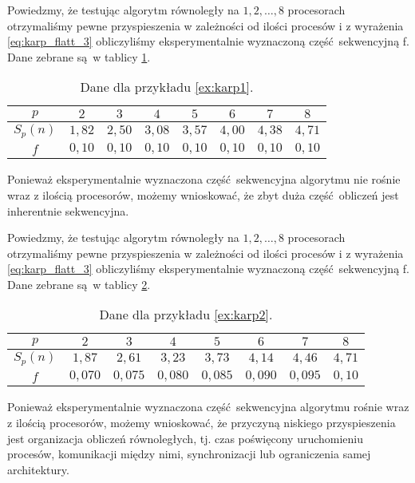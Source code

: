 \begin{przyklad}\label{ex:karp1}
Powiedzmy, że testując algorytm równoległy na \(1, 2, \dots, 8\) procesorach otrzymaliśmy pewne przyspieszenia w zależności od ilości procesów i z wyrażenia \ref{eq:karp_flatt_3} obliczyliśmy eksperymentalnie wyznaczoną część sekwencyjną f. Dane zebrane są w tablicy \ref{tab:karp_flat1}.

\begin{table}[H]
\centering
\begin{tabular}{|c|c|c|c|c|c|c|c|}
\hline
\(p\) & \(2\) & \(3\) & \(4\) & \(5\) & \(6\) & \(7\) & \(8\) \\
\hline
\(S_p(n)\) & \(1,82\) & \(2,50\) & \(3,08\) & \(3,57\) & \(4,00\) & \(4,38\) & \(4,71\) \\
\hline
\(f\) & \(0,10\) & \(0,10\) & \(0,10\) & \(0,10\) & \(0,10\) & \(0,10\) & \(0,10\) \\
\hline
\end{tabular}
\caption{Dane dla przykładu \ref{ex:karp1}.}
\label{tab:karp_flat1}
\end{table}

Ponieważ eksperymentalnie wyznaczona część sekwencyjna algorytmu nie rośnie wraz z ilością procesorów, możemy wnioskować, że zbyt duża część obliczeń jest inherentnie sekwencyjna.
\end{przyklad}

\begin{przyklad}\label{ex:karp2}
Powiedzmy, że testując algorytm równoległy na \(1, 2, \dots, 8\) procesorach otrzymaliśmy pewne przyspieszenia w zależności od ilości procesów i z wyrażenia \ref{eq:karp_flatt_3} obliczyliśmy eksperymentalnie wyznaczoną część sekwencyjną f. Dane zebrane są w tablicy \ref{tab:karp_flat2}.

\begin{table}[H]
\centering
\begin{tabular}{|c|c|c|c|c|c|c|c|}
\hline
\(p\) & \(2\) & \(3\) & \(4\) & \(5\) & \(6\) & \(7\) & \(8\) \\
\hline
\(S_p(n)\) & \(1,87\) & \(2,61\) & \(3,23\) & \(3,73\) & \(4,14\) & \(4,46\) & \(4,71\) \\
\hline
\(f\) & \(0,070\) & \(0,075\) & \(0,080\) & \(0,085\) & \(0,090\) & \(0,095\) & \(0,10\) \\
\hline
\end{tabular}
\caption{Dane dla przykładu \ref{ex:karp2}.}
\label{tab:karp_flat2}
\end{table}
Ponieważ eksperymentalnie wyznaczona część sekwencyjna algorytmu rośnie wraz z ilością procesorów, możemy wnioskować, że przyczyną niskiego przyspieszenia jest organizacja obliczeń równoległych, tj. czas poświęcony uruchomieniu procesów, komunikacji między nimi, synchronizacji lub ograniczenia samej architektury.
\end{przyklad}